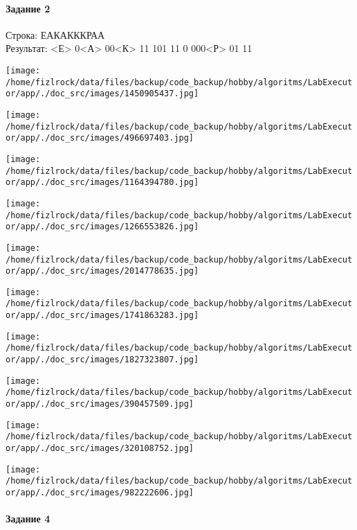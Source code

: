 \documentclass[a4paper, 12pt]{article}
\begin{document}
\paragraph{Задание 2}

Строка: 
ЕАКАКККРАА\\
Результат: <Е> 0<А> 00<К> 11 101 11 0 000<Р> 01 11

\texttt{[image: /home/fizlrock/data/files/backup/code\_backup/hobby/algoritms/LabExecutor/app/./doc\_src/images/1450905437.jpg]}

\texttt{[image: /home/fizlrock/data/files/backup/code\_backup/hobby/algoritms/LabExecutor/app/./doc\_src/images/496697403.jpg]}

\texttt{[image: /home/fizlrock/data/files/backup/code\_backup/hobby/algoritms/LabExecutor/app/./doc\_src/images/1164394780.jpg]}

\texttt{[image: /home/fizlrock/data/files/backup/code\_backup/hobby/algoritms/LabExecutor/app/./doc\_src/images/1266553826.jpg]}

\texttt{[image: /home/fizlrock/data/files/backup/code\_backup/hobby/algoritms/LabExecutor/app/./doc\_src/images/2014778635.jpg]}

\texttt{[image: /home/fizlrock/data/files/backup/code\_backup/hobby/algoritms/LabExecutor/app/./doc\_src/images/1741863283.jpg]}

\texttt{[image: /home/fizlrock/data/files/backup/code\_backup/hobby/algoritms/LabExecutor/app/./doc\_src/images/1827323807.jpg]}

\texttt{[image: /home/fizlrock/data/files/backup/code\_backup/hobby/algoritms/LabExecutor/app/./doc\_src/images/390457509.jpg]}

\texttt{[image: /home/fizlrock/data/files/backup/code\_backup/hobby/algoritms/LabExecutor/app/./doc\_src/images/320108752.jpg]}

\texttt{[image: /home/fizlrock/data/files/backup/code\_backup/hobby/algoritms/LabExecutor/app/./doc\_src/images/982222606.jpg]}
\pagebreak
\paragraph{Задание 4}
\end{document}
